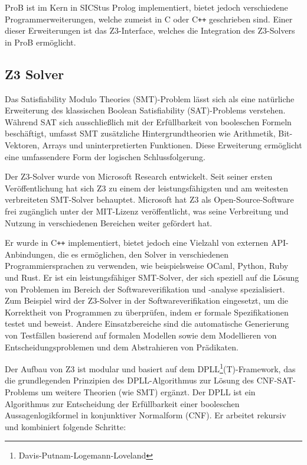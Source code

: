 ProB ist im Kern in SICStus Prolog \cite{carlsson1988sicstus} implementiert, bietet jedoch verschiedene Programmerweiterungen, welche zumeist in C oder C\texttt{++} geschrieben sind.
Einer dieser Erweiterungen ist das Z3-Interface, welches die Integration des Z3-Solvers in ProB ermöglicht.

\subsection{Z3 Solver}

Das Satisfiability Modulo Theories (SMT)-Problem lässt sich als eine natürliche Erweiterung des klassischen Boolean Satisfiability (SAT)-Problems verstehen.
Während SAT sich ausschließlich mit der Erfüllbarkeit von booleschen Formeln beschäftigt,
umfasst SMT zusätzliche Hintergrundtheorien wie Arithmetik, Bit-Vektoren, Arrays und uninterpretierten Funktionen.
Diese Erweiterung ermöglicht eine umfassendere Form der logischen Schlussfolgerung.

Der Z3-Solver \cite{10.1007/978-3-540-78800-3_24} wurde von Microsoft Research entwickelt.
Seit seiner ersten Veröffentlichung hat sich Z3 zu einem der leistungsfähigsten und am weitesten verbreiteten SMT-Solver behauptet.
Microsoft hat Z3 als Open-Source-Software frei zugänglich unter der MIT-Lizenz veröffentlicht,
was seine Verbreitung und Nutzung in verschiedenen Bereichen weiter gefördert hat.

Er wurde in C\texttt{++} implementiert, bietet jedoch eine Vielzahl von externen API-Anbindungen, die es ermöglichen, den Solver in verschiedenen Programmiersprachen zu verwenden,
wie beispielsweise OCaml, Python, Ruby und Rust.
Er ist ein leistungsfähiger SMT-Solver, der sich speziell auf die Lösung von Problemen im Bereich der Softwareverifikation und -analyse spezialisiert.
Zum Beispiel wird der Z3-Solver in der Softwareverifikation eingesetzt, um die Korrektheit von Programmen zu überprüfen, indem er formale Spezifikationen testet und beweist.
Andere Einsatzbereiche sind die automatische Generierung von Testfällen basierend auf formalen Modellen sowie dem Modellieren von Entscheidungsproblemen und dem Abstrahieren von Prädikaten.

Der Aufbau von Z3 ist modular und basiert auf dem DPLL\footnote{Davis-Putnam-Logemann-Loveland}(T)-Framework,
das die grundlegenden Prinzipien des DPLL-Algorithmus zur Lösung des CNF-SAT-Problems um weitere Theorien (wie SMT) ergänzt.
Der DPLL ist ein Algorithmus zur Entscheidung der Erfüllbarkeit einer booleschen Aussagenlogikformel in konjunktiver Normalform (CNF).
Er arbeitet rekursiv und kombiniert folgende Schritte:

